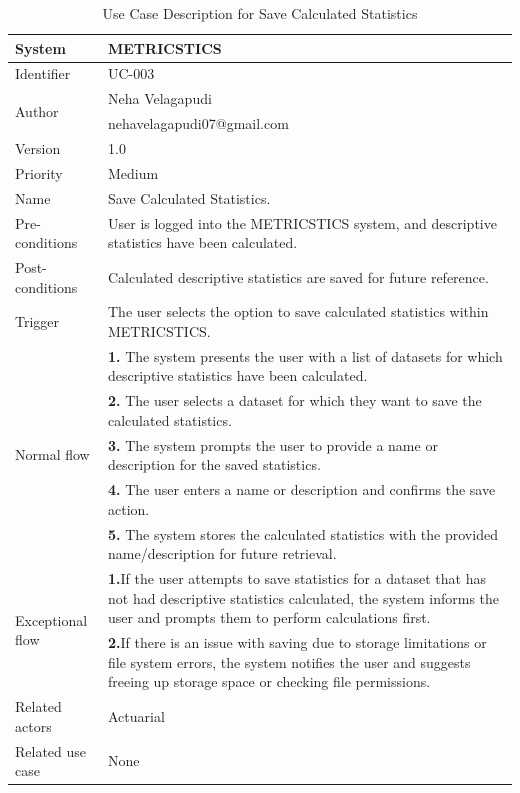 \begin{table}[htb]
    \centering
    \begin{tabular}{|p{4cm}|p{12cm}|} \hline 
         System &  METRICSTICS\\ \hline 
         
         Identifier & UC-003 \\ \hline 
         
         \multirow{2}{*}{Author} & Neha Velagapudi  \\
         &nehavelagapudi07@gmail.com \\
           \hline 
           Version & 1.0\\ \hline
         
         Priority &  Medium\\ \hline 
         
         Name & Save Calculated Statistics. \\ \hline 
         Pre-conditions & User is logged into the METRICSTICS system, and descriptive statistics have been calculated. \\ \hline 
         Post-conditions & Calculated descriptive statistics are saved for future reference. \\ \hline
         Trigger & The user selects the option to save calculated statistics within METRICSTICS. \\ \hline
        \multirow{5}{*}{Normal flow} 
        & \textbf{1.}   The system presents the user with a list of datasets for which descriptive statistics have been calculated. \\ 
        & \textbf{2.} The user selects a dataset for which they want to save the calculated statistics. \\ 
          & \textbf{3.} The system prompts the user to provide a name or description for the saved statistics. \\ 
        & \textbf{4.} The user enters a name or description and confirms the save action. \\ 
        & \textbf{5.} The system stores the calculated statistics with the provided name/description for future retrieval. \\ 
       
         
        
        \hline
         \multirow{2}{*}{Exceptional flow} 
        & \textbf{1.}If the user attempts to save statistics for a dataset that has not had descriptive statistics calculated, the system informs the user and prompts them to perform calculations first. \\ 
        & \textbf{2.}If there is an issue with saving due to storage limitations or file system errors, the system notifies the user and suggests freeing up storage space or checking file permissions. \\  \hline 
        Related actors & Actuarial \\ \hline
        Related use case & None \\ \hline
    \end{tabular}
    \caption{Use Case Description for Save Calculated Statistics}
    \label{tab:my_label}
\end{table}
